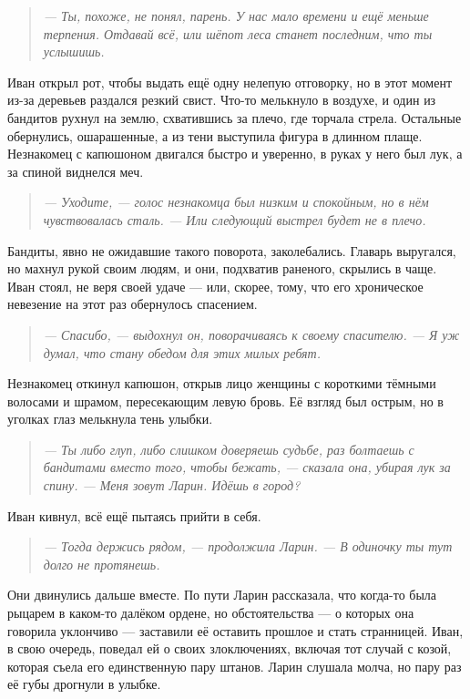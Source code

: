 \documentclass[12pt,a4paper]{book}
\newenvironment{dialogue}{\begin{quote}\itshape}{\end{quote}}
\begin{document}
\begin{dialogue}
--- Ты, похоже, не понял, парень. У нас мало времени и ещё меньше терпения. Отдавай всё, или шёпот леса станет последним, что ты услышишь.
\end{dialogue}

Иван открыл рот, чтобы выдать ещё одну нелепую отговорку, но в этот момент из-за деревьев раздался резкий свист. Что-то мелькнуло в воздухе, и один из бандитов рухнул на землю, схватившись за плечо, где торчала стрела. Остальные обернулись, ошарашенные, а из тени выступила фигура в длинном плаще. Незнакомец с капюшоном двигался быстро и уверенно, в руках у него был лук, а за спиной виднелся меч.

\begin{dialogue}
--- Уходите, --- голос незнакомца был низким и спокойным, но в нём чувствовалась сталь. --- Или следующий выстрел будет не в плечо.
\end{dialogue}

Бандиты, явно не ожидавшие такого поворота, заколебались. Главарь выругался, но махнул рукой своим людям, и они, подхватив раненого, скрылись в чаще. Иван стоял, не веря своей удаче --- или, скорее, тому, что его хроническое невезение на этот раз обернулось спасением.

\begin{dialogue}
--- Спасибо, --- выдохнул он, поворачиваясь к своему спасителю. --- Я уж думал, что стану обедом для этих милых ребят.
\end{dialogue}

Незнакомец откинул капюшон, открыв лицо женщины с короткими тёмными волосами и шрамом, пересекающим левую бровь. Её взгляд был острым, но в уголках глаз мелькнула тень улыбки.

\begin{dialogue}
--- Ты либо глуп, либо слишком доверяешь судьбе, раз болтаешь с бандитами вместо того, чтобы бежать, --- сказала она, убирая лук за спину. --- Меня зовут Ларин. Идёшь в город?
\end{dialogue}

Иван кивнул, всё ещё пытаясь прийти в себя.

\begin{dialogue}
--- Тогда держись рядом, --- продолжила Ларин. --- В одиночку ты тут долго не протянешь.
\end{dialogue}

Они двинулись дальше вместе. По пути Ларин рассказала, что когда-то была рыцарем в каком-то далёком ордене, но обстоятельства --- о которых она говорила уклончиво --- заставили её оставить прошлое и стать странницей. Иван, в свою очередь, поведал ей о своих злоключениях, включая тот случай с козой, которая съела его единственную пару штанов. Ларин слушала молча, но пару раз её губы дрогнули в улыбке.
\end{document}
